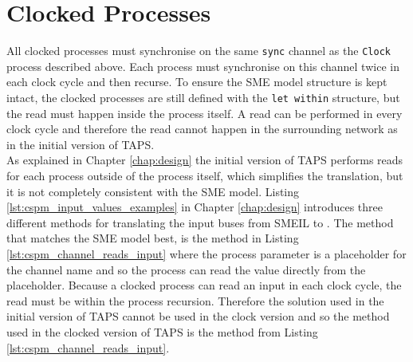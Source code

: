 \section{Clocked Processes}
All clocked processes must synchronise on the same \texttt{sync} channel as the \texttt{Clock} process described above. Each process must synchronise on this channel twice in each clock cycle and then recurse. To ensure the SME model structure is kept intact, the clocked processes are still defined with the \texttt{let within} structure, but the read must happen inside the process itself. A read can be performed in every clock cycle and therefore the read cannot happen in the surrounding network as in the initial version of TAPS.\\

As explained in Chapter \ref{chap:design} the initial version of TAPS performs reads for each process outside of the process itself, which simplifies the translation, but it is not completely consistent with the SME model. Listing \ref{lst:cspm_input_values_examples} in Chapter \ref{chap:design} introduces three different methods for translating the input buses from SMEIL to \cspm{}. The method that matches the SME model best, is the method in Listing \ref{lst:cspm_channel_reads_input} where the process parameter is a placeholder for the channel name and so the process can read the value directly from the placeholder. Because a clocked process can read an input in each clock cycle, the read must be within the process recursion. Therefore the solution used in the initial version of TAPS cannot be used in the clock version and so the method used in the clocked version of TAPS is the method from Listing \ref{lst:cspm_channel_reads_input}.\\

